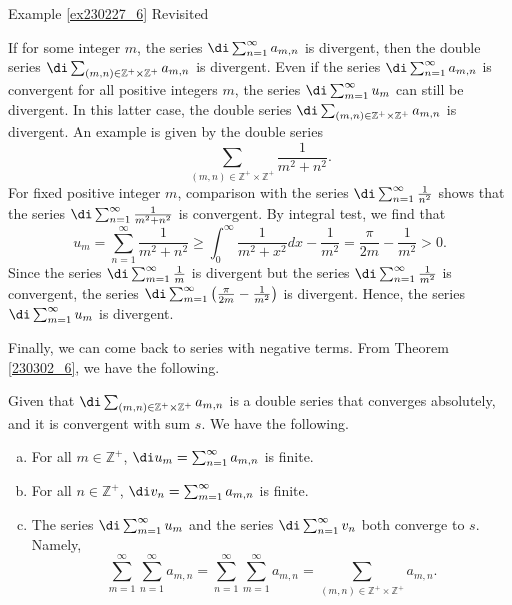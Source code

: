 \begin{example}{\linkt Example \ref{ex230227_6} Revisited}
\begin{example}[label=ex230227_13]{}
\begin{example}{}
\begin{example}[label=ex230301_6]{}
\begin{highlight}{}
If for some integer $m$, the series $\di\sum_{n=1}^{\infty}a_{m,n}$ is divergent, then the double series $\di\sum_{(m,n)\in\mathbb{Z}^+\times\mathbb{Z}^+}a_{m,n}$   is divergent. Even if the series $\di\sum_{n=1}^{\infty}a_{m,n}$ is convergent for all positive integers $m$, the series $\di\sum_{m=1}^{\infty}u_m$ can still be divergent. In this latter case, the double series $\di\sum_{(m,n)\in\mathbb{Z}^+\times\mathbb{Z}^+}a_{m,n}$   is divergent. An example is given by the double series
\[\sum_{(m,n)\in\mathbb{Z}^+\times\mathbb{Z}^+}\frac{1}{m^2+n^2}.\]
For fixed positive integer $m$, comparison with the series $\di \sum_{n=1}^{\infty}\frac{1}{n^2}$ shows that the series $\di\sum_{n=1}^{\infty}\frac{1}{m^2+n^2}$ is convergent.
By integral test, we find that
\[u_m=\sum_{n=1}^{\infty}\frac{1}{m^2+n^2}\geq \int_0^{\infty}\frac{1}{m^2+x^2}dx-\frac{1}{m^2}=\frac{\pi}{2m}-\frac{1}{m^2}>0.\]Since the series $\di\sum_{m=1}^{\infty}\frac{1}{m}$ is divergent but the series  $\di \sum_{n=1}^{\infty}\frac{1}{m^2}$  is convergent, the series $\di \sum_{m=1}^{\infty}\left(\frac{\pi}{2m}-\frac{1}{m^2}\right)$ is divergent. Hence, the series $\di\sum_{m=1}^{\infty}u_m$ is divergent.
\end{highlight}

Finally, we can come back to series with negative terms.
From Theorem \ref{230302_6}, we have the following.
\begin{theorem}[label=230302_10]{}
Given that $\di\sum_{(m,n)\in\mathbb{Z}^+\times\mathbb{Z}^+}a_{m,n}$ is a double series that converges absolutely, and 
it is convergent with sum $s$.  We have the following.
\begin{enumerate}[(a)]
\item For all $m\in\mathbb{Z}^+$, $\di u_m=\sum_{n=1}^{\infty}a_{m,n}$ is finite.
\item For all $n\in\mathbb{Z}^+$, $\di v_n=\sum_{m=1}^{\infty}a_{m,n}$ is finite.
\item The series $\di\sum_{m=1}^{\infty}u_m$ and the series $\di\sum_{n=1}^{\infty}v_n$ both converge to $s$. Namely,
\[\sum_{m=1}^{\infty} \sum_{n=1}^{\infty} a_{m,n} =\sum_{n=1}^{\infty} \sum_{m=1}^{\infty} a_{m,n}=\sum_{(m,n)\in\mathbb{Z}^+\times\mathbb{Z}^+}a_{m,n}.\]
 \end{enumerate}
 

\end{theorem}
\end{example}
\end{example}
\end{example}
\end{example}
